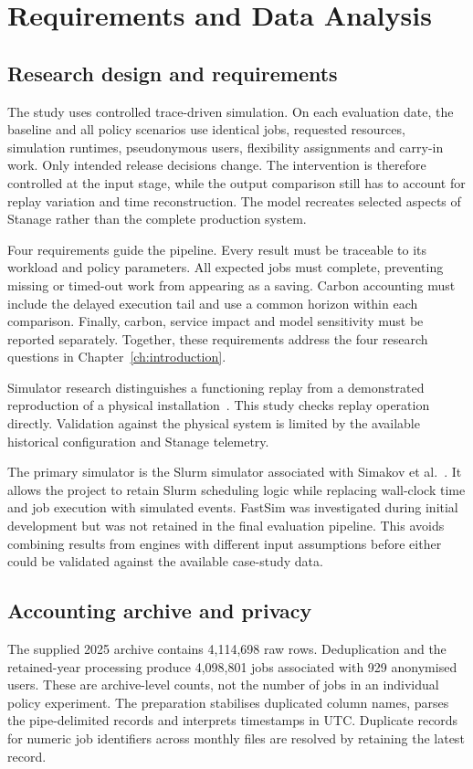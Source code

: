 \chapter{Requirements and Data Analysis}\label{ch:data}
\section{Research design and requirements}
The study uses controlled trace-driven simulation. On each evaluation date, the baseline and all policy scenarios use identical jobs, requested resources, simulation runtimes, pseudonymous users, flexibility assignments and carry-in work. Only intended release decisions change. The intervention is therefore controlled at the input stage, while the output comparison still has to account for replay variation and time reconstruction. The model recreates selected aspects of Stanage rather than the complete production system.

Four requirements guide the pipeline. Every result must be traceable to its workload and policy parameters. All expected jobs must complete, preventing missing or timed-out work from appearing as a saving. Carbon accounting must include the delayed execution tail and use a common horizon within each comparison. Finally, carbon, service impact and model sensitivity must be reported separately. Together, these requirements address the four research questions in Chapter~\ref{ch:introduction}.

Simulator research distinguishes a functioning replay from a demonstrated reproduction of a physical installation~\cite{jokanovic2018validation}. This study checks replay operation directly. Validation against the physical system is limited by the available historical configuration and Stanage telemetry.

The primary simulator is the Slurm simulator associated with Simakov et al.~\cite{simakov2022accurate}. It allows the project to retain Slurm scheduling logic while replacing wall-clock time and job execution with simulated events. FastSim was investigated during initial development but was not retained in the final evaluation pipeline. This avoids combining results from engines with different input assumptions before either could be validated against the available case-study data.

\section{Accounting archive and privacy}
The supplied 2025 archive contains 4,114,698 raw rows. Deduplication and the retained-year processing produce 4,098,801 jobs associated with 929 anonymised users. These are archive-level counts, not the number of jobs in an individual policy experiment. The preparation stabilises duplicated column names, parses the pipe-delimited records and interprets timestamps in UTC. Duplicate records for numeric job identifiers across monthly files are resolved by retaining the latest record.

